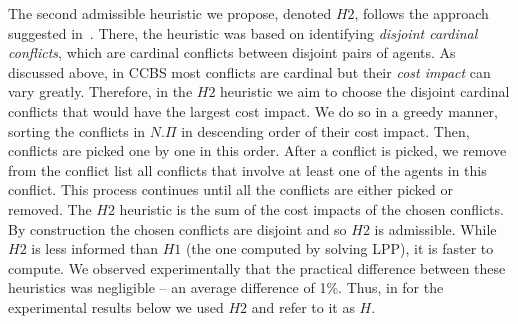 \documentclass[letterpaper]{article} %
\newcommand{\ccbs}{\ac{CCBS}\xspace}
\begin{document}

The second admissible heuristic we propose, denoted $H2$, follows the approach suggested in~\cite{CBSH}. 
There, the heuristic was based on identifying \emph{disjoint cardinal conflicts}, which are cardinal conflicts between disjoint pairs of agents. 
As discussed above, in \ccbs most conflicts are cardinal but their \emph{cost impact} can vary greatly. 
Therefore, in the $H2$ heuristic we aim to choose the disjoint cardinal conflicts that would have the largest cost impact. We do so in a greedy manner, sorting the conflicts in $N.\Pi$ in descending order of their cost impact. Then, conflicts are picked one by one in this order. 
After a conflict is picked, we remove from the conflict list all conflicts that involve at least one of the agents in this conflict. This process continues until all the conflicts are either picked or removed. 
The $H2$ heuristic is the sum of the cost impacts of the chosen conflicts. 
By construction the chosen conflicts are disjoint and so $H2$ is admissible. 
While $H2$ is less informed than $H1$ (the one computed by solving LPP), it is faster to compute. 
We observed experimentally that the practical difference between these heuristics was negligible -- an average difference of 1\%. 
Thus, in for the experimental results below we used $H2$ and refer to it as $H$. 

\end{document}
